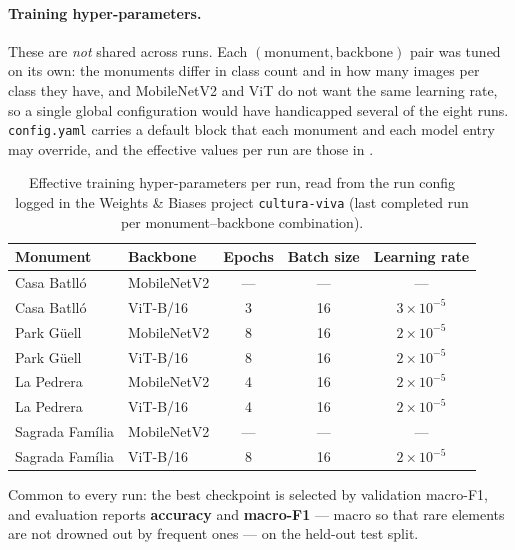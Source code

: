 \documentclass[11pt,a4paper]{article}
\begin{document}
\paragraph{Training hyper-parameters.} These are \emph{not} shared across runs.
Each $(\text{monument}, \text{backbone})$ pair was tuned on its own: the
monuments differ in class count and in how many images per class they have, and
MobileNetV2 and ViT do not want the same learning rate, so a single global
configuration would have handicapped several of the eight runs.
\texttt{config.yaml} carries a default block that each monument and each model
entry may override, and the effective values per run are those in
.

\begin{table}[h]
\centering
\caption{Effective training hyper-parameters per run, read from the run
config logged in the Weights \& Biases project \texttt{cultura-viva} (last
completed run per monument--backbone combination).\protect\footnotemark}
\label{tab:vision-hparams}
\small
\begin{tabular}{llccc}
\toprule
\textbf{Monument} & \textbf{Backbone} & \textbf{Epochs} & \textbf{Batch size} & \textbf{Learning rate} \\
\midrule
Casa Batll\'o & MobileNetV2 & --- & ---  & --- \\
Casa Batll\'o & ViT-B/16    & 3   & 16 & $3\times10^{-5}$ \\
\addlinespace
Park G\"uell  & MobileNetV2 & 8 & 16 & $2\times10^{-5}$ \\
Park G\"uell  & ViT-B/16    & 8 & 16 & $2\times10^{-5}$ \\
\addlinespace
La Pedrera    & MobileNetV2 & 4 & 16 & $2\times10^{-5}$ \\
La Pedrera    & ViT-B/16    & 4 & 16 & $2\times10^{-5}$ \\
\addlinespace
Sagrada Fam\'ilia & MobileNetV2 & --- & --- & --- \\
Sagrada Fam\'ilia & ViT-B/16    & 8 & 16 & $2\times10^{-5}$ \\
\bottomrule
\end{tabular}
\end{table}

Common to every run: the best checkpoint is selected by validation macro-F1,
and evaluation reports \textbf{accuracy} and \textbf{macro-F1} --- macro so
that rare elements are not drowned out by frequent ones --- on the held-out
test split.
\end{document}
